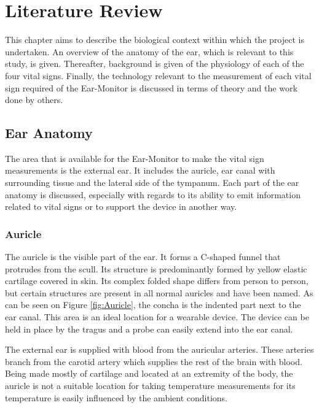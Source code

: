 \chapter{Literature Review}
\label{chp:Literature Review}
This chapter aims to describe the biological context within which the project is undertaken. An overview of the anatomy of the ear, which is relevant to this study, is given. Thereafter, background is given of the physiology of each of the four vital signs. Finally, the technology relevant to the measurement of each vital sign required of the Ear-Monitor is discussed in terms of theory and the work done by others.

\section{Ear Anatomy} %
The area that is available for the Ear-Monitor to make the vital sign measurements is the external ear. It includes the auricle, ear canal with surrounding tissue and the lateral side of the tympanum.  Each part of the ear anatomy is discussed, especially with regards to its ability to emit information related to vital signs or to support the device in another way.

\subsection{Auricle}
The auricle is the visible part of the ear. It forms a C-shaped funnel that protrudes from the scull. Its structure is predominantly formed by yellow elastic cartilage covered in skin. Its complex folded shape differs from person to person, but certain structures are present in all normal auricles and have been named. As can be seen on Figure \ref{fig:Auricle}, the concha is the indented part next to the ear canal. This area is an ideal location for a wearable device. The device can be held in place by the tragus and a probe can easily extend into the ear canal.

\medskip

The external ear is supplied with blood from the auricular arteries. These arteries branch from the carotid artery which supplies the rest of the brain with blood. Being made mostly of cartilage and located at an extremity of the body, the auricle is not a suitable location for taking temperature measurements for its temperature is easily influenced by the ambient conditions.

